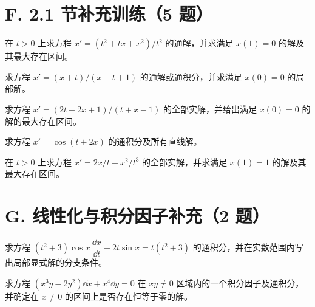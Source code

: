 \section{F. 2.1 节补充训练（5 题）}
\noindent\begin{minipage}{\linewidth}
在 $t>0$ 上求方程 $x'=(t^2+tx+x^2)/t^2$ 的通解，并求满足 $x(1)=0$ 的解及其最大存在区间。
\end{minipage}\par\vspace{5pt}
\noindent\begin{minipage}{\linewidth}
求方程 $x'=(x+t)/(x-t+1)$ 的通解或通积分，并求满足 $x(0)=0$ 的局部解。
\end{minipage}\par\vspace{5pt}
\noindent\begin{minipage}{\linewidth}
求方程 $x'=(2t+2x+1)/(t+x-1)$ 的全部实解，并给出满足 $x(0)=0$ 的解的最大存在区间。
\end{minipage}\par\vspace{5pt}
\noindent\begin{minipage}{\linewidth}
求方程 $x'=\cos(t+2x)$ 的通积分及所有直线解。
\end{minipage}\par\vspace{5pt}
\noindent\begin{minipage}{\linewidth}
在 $t>0$ 上求方程 $x'=2x/t+x^2/t^3$ 的全部实解，并求满足 $x(1)=1$ 的解及其最大存在区间。
\end{minipage}\par\vspace{5pt}
\section{G. 线性化与积分因子补充（2 题）}
\noindent\begin{minipage}{\linewidth}
求方程 $(t^2+3)\cos x\,\dfrac{\dd x}{\dd t}+2t\sin x=t(t^2+3)$ 的通积分，并在实数范围内写出局部显式解的分支条件。
\end{minipage}\par\vspace{5pt}
\noindent\begin{minipage}{\linewidth}
求方程 $(x^3y-2y^2)\dd x+x^4\dd y=0$ 在 $xy\ne0$ 区域内的一个积分因子及通积分，并确定在 $x\ne0$ 的区间上是否存在恒等于零的解。
\end{minipage}\par\vspace{5pt}
